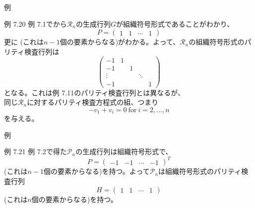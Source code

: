 \documentclass[dvipdfmx,10pt,jsarticle]{beamer}
\begin{document}
  \begin{frame}{例}
    \begin{block}{例 7.20}
      例 7.1でから$\mathcal{R}_n$の生成行列$G$が組織符号形式であることがわかり、
      \[ P = \begin{pmatrix}
          1 & 1 & \cdots & 1
      \end{pmatrix} \]
      更に (これは$n - 1$個の要素からなる)がわかる。よって、$\mathcal{R}_n$の組織符号形式のパリティ検査行列は
      \[ \begin{pmatrix}
          -1 & 1  \\
          -1 &   & 1 \\
          \vdots &   &   & \ddots \\
          -1 &  &  &   & 1
      \end{pmatrix}  \]
      となる。これは例 7.11のパリティ検査行列とは異なるが、 \\
      同じ$\mathcal{R}_n$に対するパリティ検査方程式の組、つまり
      \[-v_1 + v_i = 0 \ \text{for} \ i  = 2, \ldots, n\]
      を与える。
    \end{block}
  \end{frame}

  \begin{frame}{例}
    \begin{block}{例 7.21}
      例 7.2で得た$\mathcal{P}_n$の生成行列は組織符号形式で、
      \[ P = \begin{pmatrix}
          -1 & -1 & \cdots & -1
      \end{pmatrix}^T \]
      (これは$n - 1$個の要素からなる)を持つ。よって$\mathcal{P}_n$は組織符号形式のパリティ検査行列
      \[ H = \begin{pmatrix}
          1 & 1 & \cdots & 1
      \end{pmatrix} \]
      (これは$n$個の要素からなる)を持つ。
    \end{block}
  \end{frame}
\end{document}
